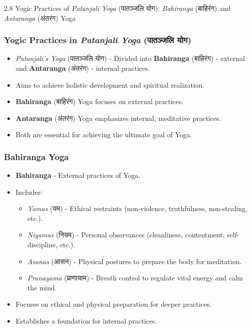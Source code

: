 \begin{frame}[fragile]\frametitle{}
\begin{center}
{\Large 2.8  Yogic Practices of \textit{Patanjali Yoga} (पातञ्जलि योग): \textit{Bahiranga} (बाहिरंग) and \textit{Antaranga} (अंतरंग) Yoga}
\end{center}
\end{frame}

\begin{frame}[fragile]\frametitle{Yogic Practices in \textit{Patanjali Yoga} (पातञ्जलि योग)}

      \begin{itemize}
		\item \textit{Patanjali’s Yoga} (पातञ्जलि योग) - Divided into \textbf{Bahiranga} (बाहिरंग) - external and \textbf{Antaranga} (अंतरंग) - internal practices.
		\item Aims to achieve holistic development and spiritual realization.
		\item \textbf{Bahiranga} (बाहिरंग) Yoga focuses on external practices.
		\item \textbf{Antaranga} (अंतरंग) Yoga emphasizes internal, meditative practices.
		\item Both are essential for achieving the ultimate goal of Yoga.
	  \end{itemize}

\end{frame}


\begin{frame}[fragile]\frametitle{Bahiranga Yoga}

      \begin{itemize}
		\item \textbf{Bahiranga} - External practices of Yoga.
		\item Includes:
		  \begin{itemize}
		      \item \textit{Yamas} (यम) - Ethical restraints (non-violence, truthfulness, non-stealing, etc.).
		      \item \textit{Niyamas} (नियम) - Personal observances (cleanliness, contentment, self-discipline, etc.).
		      \item \textit{Asanas} (आसन) - Physical postures to prepare the body for meditation.
		      \item \textit{Pranayama} (प्राणायाम) - Breath control to regulate vital energy and calm the mind.
		  \end{itemize}
		\item Focuses on ethical and physical preparation for deeper practices.
		\item Establishes a foundation for internal practices.
	  \end{itemize}

\end{frame}

